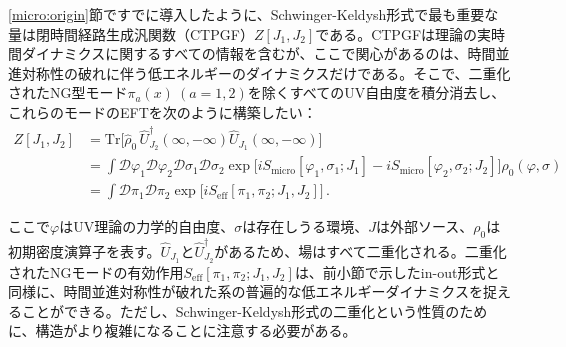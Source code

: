 \ref{micro:origin}節ですでに導入したように、Schwinger-Keldysh形式で最も重要な量は閉時間経路生成汎関数（CTPGF）$Z[J_1, J_2]$である。CTPGFは理論の実時間ダイナミクスに関するすべての情報を含むが、ここで関心があるのは、時間並進対称性の破れに伴う低エネルギーのダイナミクスだけである。そこで、二重化されたNG型モード$\pi_a(x) ~(a=1,2)$を除くすべてのUV自由度を積分消去し、これらのモードのEFTを次のように構築したい：
\begin{align}
\nonumber
  Z[J_1, J_2] 
  &= \mathrm{Tr} \Big[\hat{\rho}_0 \,
  \hat{U}_{J_2}^\dagger(\infty,-\infty)
  \hat{U}_{J_1} (\infty,-\infty) \Big]\,  \\
\nonumber
  &=\int \mathcal{D} \varphi_1 \mathcal{D} \varphi_2
  \mathcal{D} \sigma_1 \mathcal{D} \sigma_2
  \exp \Big[
  iS_{\mathrm{micro}} [\varphi_1,\sigma_1;J_1] 
 - iS_{\mathrm{micro}} [\varphi_2,\sigma_2;J_2] \Big]  
  \rho_0 (\varphi,\sigma) 
  \, \\
  &= \int \mathcal{D} \pi_1 \mathcal{D} \pi_2
  \exp \Big[
  iS_{\mathrm{eff}} [\pi_1,\pi_2;J_1,J_2] \Big]\, .
 \label{eq:CTPGF}
\end{align}

ここで$\varphi$はUV理論の力学的自由度、$\sigma$は存在しうる環境、$J$は外部ソース、$\rho_0$は初期密度演算子を表す。$\hat{U}_{J_1}$と$\hat{U}^\dag_{J_2}$があるため、場はすべて二重化される。二重化されたNGモードの有効作用$S_{\mathrm{eff}} [\pi_1,\pi_2;J_1,J_2]$は、前小節で示したin-out形式と同様に、時間並進対称性が破れた系の普遍的な低エネルギーダイナミクスを捉えることができる。ただし、Schwinger-Keldysh形式の二重化という性質のために、構造がより複雑になることに注意する必要がある。

